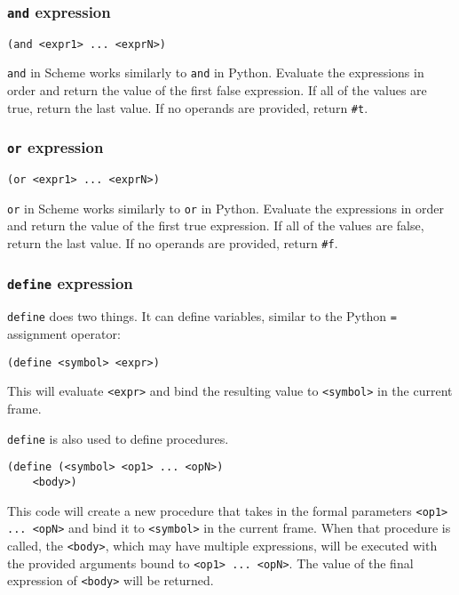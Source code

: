 \subsubsection{\lstinline{and} expression}
\begin{lstlisting}
(and <expr1> ... <exprN>)
\end{lstlisting}
\lstinline{and} in Scheme works similarly to \lstinline{and} in Python. Evaluate the expressions in order and return the value of the first false expression. If all of the values are true, return the last value. If no operands are provided, return \lstinline{#t}.

\subsubsection{\lstinline{or} expression}
\begin{lstlisting}
(or <expr1> ... <exprN>)
\end{lstlisting}
\lstinline{or} in Scheme works similarly to \lstinline{or} in Python. Evaluate the expressions in order and return the value of the first true expression. If all of the values are false, return the last value. If no operands are provided, return \lstinline{#f}.

\subsubsection{\lstinline{define} expression}

\lstinline{define} does two things. It can define variables, similar to the Python \lstinline{=} assignment operator:
\begin{lstlisting}
(define <symbol> <expr>)
\end{lstlisting}
This will evaluate \lstinline{<expr>} and bind the resulting value to \lstinline{<symbol>} in the current frame. 

\lstinline{define} is also used to define procedures. 

\begin{lstlisting}
(define (<symbol> <op1> ... <opN>) 
    <body>)
    \end{lstlisting} 
This code will create a new procedure that takes in the formal parameters \lstinline{<op1> ... <opN>} and bind it to \lstinline{<symbol>} in the current frame. When that procedure is called, the \lstinline{<body>}, which may have multiple expressions, will be executed with the provided arguments bound to \lstinline{<op1> ... <opN>}. The value of the final expression of \lstinline{<body>} will be returned. 

